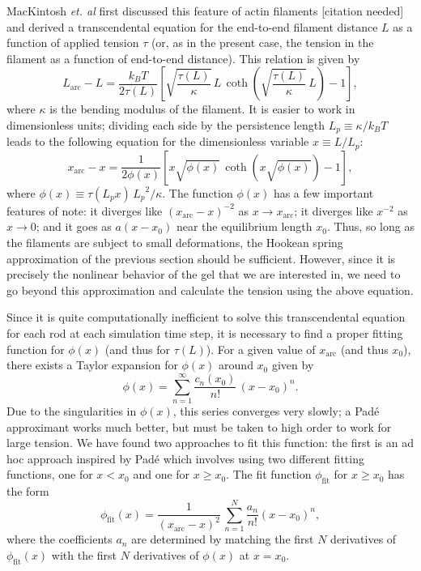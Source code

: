 \documentclass[pre,floatfix,twocolumn]{revtex4}
\begin{document}
MacKintosh \emph{et. al} first discussed this feature of actin filaments [citation needed] and derived a transcendental equation for the end-to-end filament distance $L$ as a function of applied tension $\tau$ (or, as in the present case, the tension in the filament as a function of end-to-end distance).  This relation is given by
\[
L_{\text{arc}}-L = \frac{k_{B}T}{2\tau(L)}\left[\sqrt{\frac{\tau(L)}{\kappa}}\,L\,\coth\left(\sqrt{\frac{\tau(L)}{\kappa}}\,L\right)-1\right],
\]
where $\kappa$ is the bending modulus of the filament.  It is easier to work in dimensionless units; dividing each side by the persistence length $L_{p} \equiv \kappa/k_{B}T$ leads to the following equation for the dimensionless variable $x \equiv L/L_{p}$:
\[
x_{\text{arc}}-x = \frac{1}{2\phi(x)}\left[x\sqrt{\phi(x)}\,\coth\left(x\sqrt{\phi(x)}\right)-1\right],
\]
where $\phi(x) \equiv \tau(L_px)\,{L_{p}}^2/\kappa$.  The function $\phi(x)$ has a few important features of note: it diverges like $(x_{\text{arc}}-x)^{-2}$ as $x\to x_{\text{arc}}$; it diverges like $x^{-2}$ as $x\to0$; and it goes as $a(x-x_{0})$ near the equilibrium length $x_{0}$.  Thus, so long as the filaments are subject to small deformations, the Hookean spring approximation of the previous section should be sufficient.  However, since it is precisely the nonlinear behavior of the gel that we are interested in, we need to go beyond this approximation and calculate the tension using the above equation.

Since it is quite computationally inefficient to solve this transcendental equation for each rod at each simulation time step, it is necessary to find a proper fitting function for $\phi(x)$ (and thus for $\tau(L)$).  For a given value of $x_{\text{arc}}$ (and thus $x_{0}$), there exists a Taylor expansion for $\phi(x)$ around $x_{0}$ given by
\[
\phi(x) = \sum_{n=1}^{\infty}\frac{c_{n}(x_{0})}{n!}\,(x-x_{0})^n.
\]
Due to the singularities in $\phi(x)$, this series converges very slowly; a Pad\'{e} approximant works much better, but must be taken to high order to work for large tension.  We have found two approaches to fit this function: the first is an ad hoc approach inspired by Pad\'{e} which involves using two different fitting functions, one for $x<x_{0}$ and one for $x\ge x_{0}$.  The fit function $\phi_{\text{fit}}$ for $x\ge x_0$ has the form
\[
\phi_{\text{fit}}(x) = \frac{1}{(x_{\text{arc}}-x)^2}\,\sum_{n=1}^{N}\frac{a_{n}}{n!}(x-x_{0})^n,
\]
where the coefficients $a_n$ are determined by matching the first $N$ derivatives of $\phi_{\text{fit}}(x)$ with the first $N$ derivatives of $\phi(x)$ at $x=x_0$.
\end{document}
